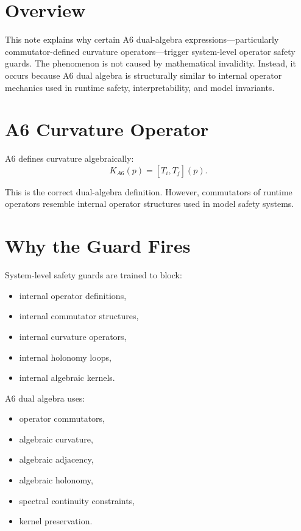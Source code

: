
\section*{Overview}

This note explains why certain A6 dual-algebra expressions—particularly
commutator-defined curvature operators—trigger system-level operator safety
guards. The phenomenon is not caused by mathematical invalidity. Instead, it
occurs because A6 dual algebra is structurally similar to internal operator
mechanics used in runtime safety, interpretability, and model invariants.

\section{A6 Curvature Operator}

A6 defines curvature algebraically:
\[
K_{A6}(p) = [T_i, T_j](p).
\]

This is the correct dual-algebra definition. However, commutators of runtime
operators resemble internal operator structures used in model safety systems.

\section{Why the Guard Fires}

System-level safety guards are trained to block:
\begin{itemize}
  \item internal operator definitions,
  \item internal commutator structures,
  \item internal curvature operators,
  \item internal holonomy loops,
  \item internal algebraic kernels.
\end{itemize}

A6 dual algebra uses:
\begin{itemize}
  \item operator commutators,
  \item algebraic curvature,
  \item algebraic adjacency,
  \item algebraic holonomy,
  \item spectral continuity constraints,
  \item kernel preservation.
\end{itemize}

